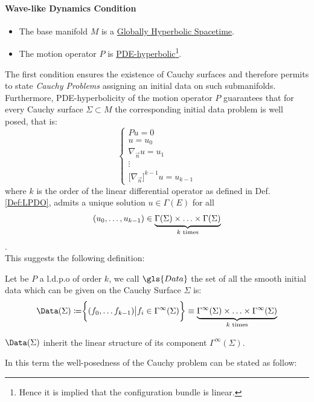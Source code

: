 \documentclass[Main]{subfiles}
\begin{document}
		\paragraph{Wave-like %
			Dynamics Condition}
		\begin{itemize}
			 \item The base manifold $M$ is a \underline{Globally Hyperbolic Spacetime}.
			 \item The motion operator $P$ is \underline{PDE-hyperbolic}\footnote{Hence it is implied that the configuration bundle is linear.}.
		\end{itemize}
		The first condition ensures the existence of Cauchy surfaces and therefore permits to state  \emph{Cauchy Problems} assigning an initial data on such submanifolds.
		Furthermore, PDE-hyperbolicity of the motion operator $P$ guarantees that for every Cauchy surface $\Sigma \subset M$ the corresponding initial data problem is well posed, that is:
			\begin{equation}\label{CauchyProblem}
				\begin{cases} P u = 0 \\ u = u_0 \\ \nabla_{\vec{n}}u= u_1 \\  \vdots \\ \big[\nabla_{\vec{n}} \big]^{k-1}u = u_{k-1}\end{cases}
			\end{equation}
			where $k$ is the order of the linear differential operator as defined in Def. \ref{Def:LPDO},
			admits a unique solution $u\in \Gamma(E)$ for all 
			\begin{displaymath}
				(u_0,\ldots, u_{k-1}) \in \underbrace{\Gamma (\Sigma )\times \ldots \times \Gamma (\Sigma )}_{\footnotesize{ k \textrm{ times}}}
			\end{displaymath}.
			\\
			This suggests the following definition:
			\begin{definition}
				Let be  $P$ a l.d.p.o of order $k$, we call $\gls{Data}$ the set of all the smooth initial data which can be given on the Cauchy Surface $\Sigma$ is:
				\begin{displaymath}
					\Data(\Sigma)  \coloneqq \biggr \{ (f_0,\ldots f_{k-1}) \big \vert f_i \in \Gamma^\infty(\Sigma)\biggr\}  \equiv
					\underbrace{\Gamma^\infty (\Sigma )\times \ldots \times \Gamma^\infty (\Sigma )}_{\footnotesize{ k \textrm{ times}}}					
				\end{displaymath}
			\end{definition}
			\begin{remark}
				$\Data(\Sigma)$ inherit the linear structure of its component $ \Gamma^\infty(\Sigma)$.
			\end{remark}	
			In this term the well-posedness of the Cauchy problem can be stated as follow:
\end{document}
